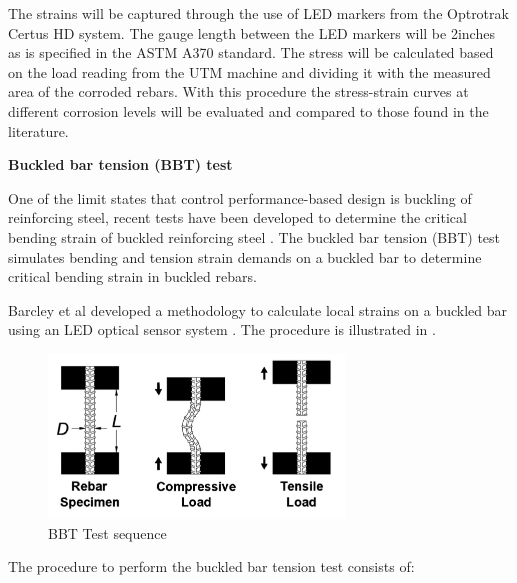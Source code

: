 The strains will be captured through the use of LED markers from the Optrotrak Certus HD system. The gauge length between the LED markers will be 2inches as is specified in the ASTM A370 standard. The stress will be calculated based on the load reading from the UTM machine and dividing it with the measured area of the corroded rebars. With this procedure the stress-strain curves at different corrosion levels will be evaluated and compared to those found in the literature.
\newline

\textbf{Buckled bar tension (BBT) test}

One of the limit states that control performance-based design is buckling of reinforcing steel, recent tests have been developed to determine the critical bending strain of buckled reinforcing steel \cite{Barcley2019}. The buckled bar tension (BBT) test simulates bending and tension strain demands on a buckled bar to determine critical bending strain in buckled rebars. 

Barcley et al \cite{Barcley2019} developed a methodology to calculate local strains on a buckled bar using an LED optical sensor system \cite{NorthernDigitalInc.2020}. The procedure is illustrated in .

\begin{figure}[htbp]
	\centering
	\includegraphics[width=0.7\textwidth]{Chapter-3/figs/BBT_Sequence}
	\caption{BBT Test sequence\cite{Barcley2019}}
	\label{fig:BBTseq}
\end{figure}

The procedure to perform the buckled bar tension test consists of:


